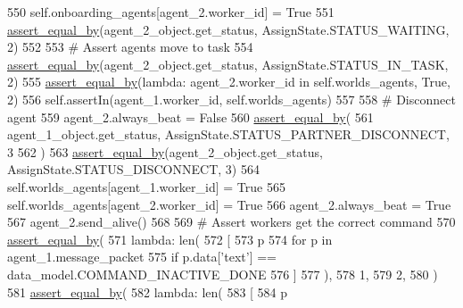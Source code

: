 \begin{DoxyCode}
550         self.onboarding\_agents[agent\_2.worker\_id] = \textcolor{keyword}{True}
551         \hyperlink{namespaceparlai_1_1mturk_1_1core_1_1test_1_1test__full__system_a0b463246d35658a2e422010f13dcf819}{assert\_equal\_by}(agent\_2\_object.get\_status, AssignState.STATUS\_WAITING, 2)
552 
553         \textcolor{comment}{# Assert agents move to task}
554         \hyperlink{namespaceparlai_1_1mturk_1_1core_1_1test_1_1test__full__system_a0b463246d35658a2e422010f13dcf819}{assert\_equal\_by}(agent\_2\_object.get\_status, AssignState.STATUS\_IN\_TASK, 2)
555         \hyperlink{namespaceparlai_1_1mturk_1_1core_1_1test_1_1test__full__system_a0b463246d35658a2e422010f13dcf819}{assert\_equal\_by}(\textcolor{keyword}{lambda}: agent\_2.worker\_id \textcolor{keywordflow}{in} self.worlds\_agents, \textcolor{keyword}{True}, 2)
556         self.assertIn(agent\_1.worker\_id, self.worlds\_agents)
557 
558         \textcolor{comment}{# Disconnect agent}
559         agent\_2.always\_beat = \textcolor{keyword}{False}
560         \hyperlink{namespaceparlai_1_1mturk_1_1core_1_1test_1_1test__full__system_a0b463246d35658a2e422010f13dcf819}{assert\_equal\_by}(
561             agent\_1\_object.get\_status, AssignState.STATUS\_PARTNER\_DISCONNECT, 3
562         )
563         \hyperlink{namespaceparlai_1_1mturk_1_1core_1_1test_1_1test__full__system_a0b463246d35658a2e422010f13dcf819}{assert\_equal\_by}(agent\_2\_object.get\_status, AssignState.STATUS\_DISCONNECT, 3)
564         self.worlds\_agents[agent\_1.worker\_id] = \textcolor{keyword}{True}
565         self.worlds\_agents[agent\_2.worker\_id] = \textcolor{keyword}{True}
566         agent\_2.always\_beat = \textcolor{keyword}{True}
567         agent\_2.send\_alive()
568 
569         \textcolor{comment}{# Assert workers get the correct command}
570         \hyperlink{namespaceparlai_1_1mturk_1_1core_1_1test_1_1test__full__system_a0b463246d35658a2e422010f13dcf819}{assert\_equal\_by}(
571             \textcolor{keyword}{lambda}: len(
572                 [
573                     p
574                     \textcolor{keywordflow}{for} p \textcolor{keywordflow}{in} agent\_1.message\_packet
575                     \textcolor{keywordflow}{if} p.data[\textcolor{stringliteral}{'text'}] == data\_model.COMMAND\_INACTIVE\_DONE
576                 ]
577             ),
578             1,
579             2,
580         )
581         \hyperlink{namespaceparlai_1_1mturk_1_1core_1_1test_1_1test__full__system_a0b463246d35658a2e422010f13dcf819}{assert\_equal\_by}(
582             \textcolor{keyword}{lambda}: len(
583                 [
584                     p

\end{DoxyCode}
